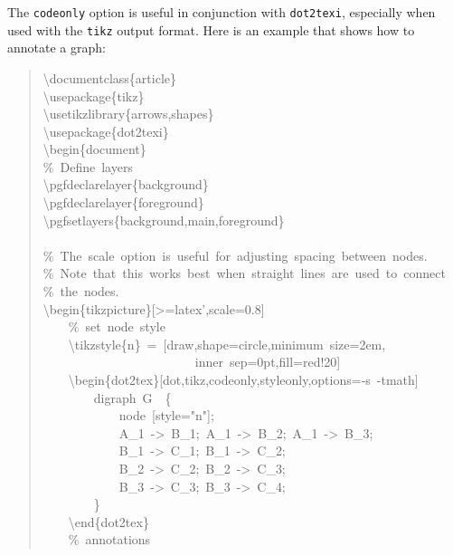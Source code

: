 \documentclass[10pt,a4paper,english]{article}
\begin{document}
The \texttt{codeonly} option is useful in conjunction with \texttt{dot2texi}, especially when used with the \texttt{tikz} output format. Here is an example that shows how to annotate a graph:
\begin{quote}{\ttfamily \raggedright \noindent
{\textbackslash}documentclass{\{}article{\}}~\\
{\textbackslash}usepackage{\{}tikz{\}}~\\
{\textbackslash}usetikzlibrary{\{}arrows,shapes{\}}~\\
{\textbackslash}usepackage{\{}dot2texi{\}}~\\
{\textbackslash}begin{\{}document{\}}~\\
{\%}~Define~layers~\\
{\textbackslash}pgfdeclarelayer{\{}background{\}}~\\
{\textbackslash}pgfdeclarelayer{\{}foreground{\}}~\\
{\textbackslash}pgfsetlayers{\{}background,main,foreground{\}}~\\
~\\
{\%}~The~scale~option~is~useful~for~adjusting~spacing~between~nodes.~\\
{\%}~Note~that~this~works~best~when~straight~lines~are~used~to~connect~\\
{\%}~the~nodes.~\\
{\textbackslash}begin{\{}tikzpicture{\}}{[}>=latex',scale=0.8{]}~\\
~~~~{\%}~set~node~style~\\
~~~~{\textbackslash}tikzstyle{\{}n{\}}~=~{[}draw,shape=circle,minimum~size=2em,~\\
~~~~~~~~~~~~~~~~~~~~~~~~inner~sep=0pt,fill=red!20{]}~\\
~~~~{\textbackslash}begin{\{}dot2tex{\}}{[}dot,tikz,codeonly,styleonly,options=-s~-tmath{]}~\\
~~~~~~~~digraph~G~~{\{}~\\
~~~~~~~~~~~~node~{[}style="n"{]};~\\
~~~~~~~~~~~~A{\_}1~->~B{\_}1;~A{\_}1~->~B{\_}2;~A{\_}1~->~B{\_}3;~\\
~~~~~~~~~~~~B{\_}1~->~C{\_}1;~B{\_}1~->~C{\_}2;~\\
~~~~~~~~~~~~B{\_}2~->~C{\_}2;~B{\_}2~->~C{\_}3;~\\
~~~~~~~~~~~~B{\_}3~->~C{\_}3;~B{\_}3~->~C{\_}4;~\\
~~~~~~~~{\}}~\\
~~~~{\textbackslash}end{\{}dot2tex{\}}~\\
~~~~{\%}~annotations~\\
}
\end{quote}
\end{document}
